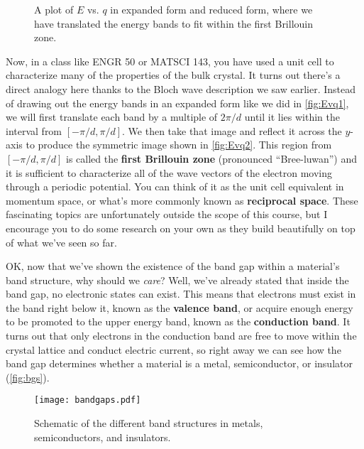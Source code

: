 \begin{figure}[!h]
	\centering
	\hfill
	\caption{A plot of $E$ vs. $q$ in \protect{} expanded form and 
	\protect{} reduced form, where we have translated the energy bands to fit within the first Brillouin zone.}
	\label{fig:Evq}
\end{figure}

Now, in a class like ENGR 50 or MATSCI 143, you have used a unit cell to characterize many of the properties of the bulk crystal. 
It turns out there's a direct analogy here thanks to the Bloch wave description we saw earlier. 
Instead of drawing out the energy bands in an expanded form like we did in \autoref{fig:Evq1}, we will first translate each band by a multiple of $2\pi/d$ until it lies within the interval from $[-\pi/d, \pi/d]$. 
We then take that image and reflect it across the $y$-axis to produce the symmetric image shown in \autoref{fig:Evq2}. 
This region from $[-\pi/d, \pi/d]$ is called the \textbf{first Brillouin zone} (pronounced ``Bree-luwan'') and it is sufficient to characterize all of the wave vectors of the electron moving through a periodic potential. 
You can think of it as the unit cell equivalent in momentum space, or what's more commonly known as \textbf{reciprocal space}. 
These fascinating topics are unfortunately outside the scope of this course, but I encourage you to do some research on your own as they build beautifully on top of what we've seen so far.

OK, now that we've shown the existence of the band gap within a material's band structure, why should we \emph{care}? 
Well, we've already stated that inside the band gap, no electronic states can exist. 
This means that electrons must exist in the band right below it, known as the \textbf{valence band}, or acquire enough energy to be promoted to the upper energy band, known as the \textbf{conduction band}. 
It turns out that only electrons in the conduction band are free to move within the crystal lattice and conduct electric current, so right away we can see how the band gap determines whether a material is a metal, semiconductor, or insulator (\autoref{fig:bgs}).

\begin{figure}[!h]
	\centering
	\texttt{[image: bandgaps.pdf]}
	\caption{Schematic of the different band structures in metals, semiconductors, and insulators.}
	\label{fig:bgs}
\end{figure}

